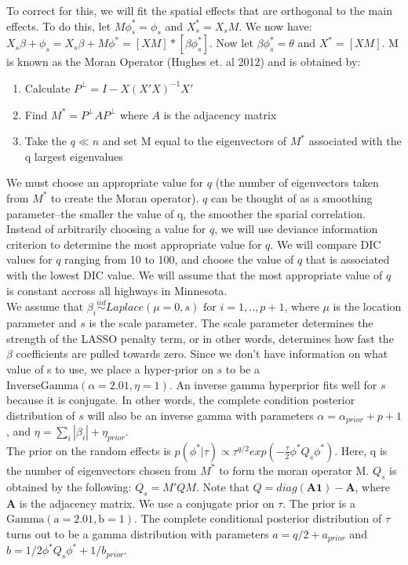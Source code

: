 To correct for this, we will fit the spatial effects that are orthogonal to the main effects. To do this, let $M \phi_s^* = \phi_s$ and $X_s^* = X_s M$. We now have: $X_s\beta + \phi_s = X_s\beta + M \phi^* = [XM] * [\beta \phi_s^*]$. Now let $\beta \phi_s^* = \theta$ and $X^* = [XM]$. M is known as the Moran Operator (Hughes et. al 2012) and is obtained by:

\begin{enumerate}

\item Calculate $P^\perp = I - X(X'X)^{-1}X'$
\item Find $M^* =  P^\perp A P^\perp $ where $A$ is the adjacency matrix
\item Take the $q \ll n$ and set M equal to the eigenvectors of $M^*$ associated with the q largest eigenvalues

\end{enumerate}

We must choose an appropriate value for $q$ (the number of eigenvectors taken from $M^*$ to create the Moran operator). $q$ can be thought of as a smoothing parameter--the smaller the value of q, the smoother the sparial correlation. Instead of arbitrarily choosing a value for $q$, we will use deviance information criterion to determine the most appropriate value for $q$. We will compare DIC values for $q$ ranging from 10 to 100, and choose the value of $q$ that is associated with the lowest DIC value. We will assume that the most appropriate value of $q$ is constant accross all highways in Minnesota. \\

We assume that $\beta_i \stackrel{iid}{\sim} Laplace(\mu=0,s) \textrm{ for }  i=1,..,p+1$, where $\mu$ is the location parameter and $s$ is the scale parameter. The scale parameter determines the strength of the LASSO penalty term, or in other words, determines how fast the $\beta$ coefficients are pulled towards zero. Since we don't have information on what value of s to use, we place a hyper-prior on $s$ to be a $\textrm{InverseGamma}(\alpha=2.01,\eta=1)$. An inverse gamma hyperprior fits well for $s$ because it is conjugate. In other words, the complete condition posterior distribution of $s$ will also be an inverse gamma with parameters $\alpha = \alpha_{prior} + p + 1 $, and $\eta = \sum_i |\beta_i| + \eta_{prior}$. \\


The prior on the random effects is $p(\phi^*|\tau) \propto \tau^{q/2} exp(- \frac{\tau}{2} \phi^* Q_s \phi^*)$. Here, q is the number of eigenvectors chosen from $M^*$ to form the moran operator M. $Q_s$ is obtained by the following: $Q_s = M'QM$. Note that $Q = diag(\bm{A}\bm{1}) - \bm{A}$, where $\bm{A}$ is the adjacency matrix. We use a conjugate prior on $\tau$.  The prior is a $\textrm{Gamma}(\textrm{a}=2.01,\textrm{b}=1)$. The complete conditional posterior distribution of $\tau$ turns out to be a gamma distribution with parameters $a = q/2 + a_{prior}$ and $b = 1/2 \phi^*  Q_s  \phi^* + 1/b_{prior}$.

